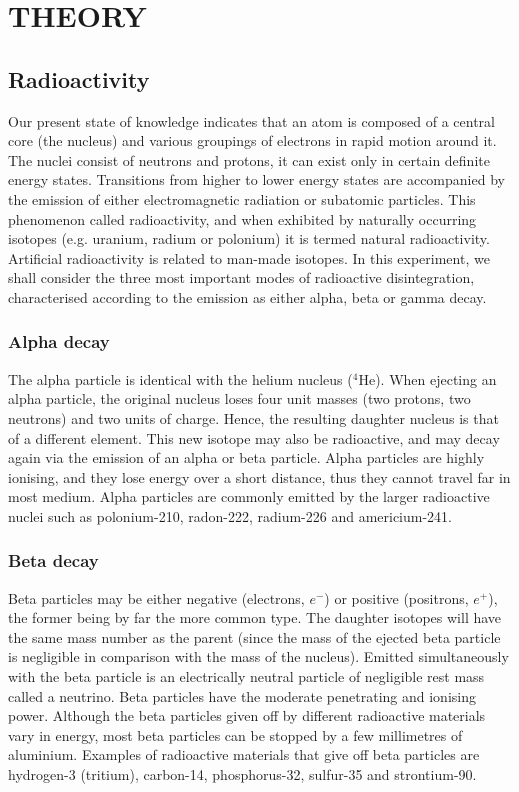 \documentclass[a4paper,11pt]{article}
\begin{document}
\newpage
{}
\section*{\center THEORY}
\label{sec:THEORY}
\subsection*{Radioactivity}
Our present state of knowledge indicates that an atom is composed of a central core (the nucleus) and various groupings of electrons in rapid motion around it. The nuclei consist of neutrons and protons, it can exist only in certain definite energy states. Transitions from higher to lower energy states are accompanied by the emission of either electromagnetic radiation or subatomic particles. This phenomenon called radioactivity, and when exhibited by naturally occurring isotopes (e.g. uranium, radium or polonium) it is termed natural radioactivity.\\

Artificial radioactivity is related to man-made isotopes. In this experiment, we shall consider the three most important modes of radioactive disintegration, characterised according to the emission as either alpha, beta or gamma decay.

\subsubsection*{Alpha decay}
The alpha particle is identical with the helium nucleus ($^4\mathrm{He}$). When ejecting an alpha particle, the original nucleus loses four unit masses (two protons, two neutrons) and two units of charge. Hence, the resulting daughter nucleus is that of a different element. This new isotope may also be radioactive, and may decay again via the emission of an alpha or beta particle. Alpha particles are highly ionising, and they lose energy over a short distance, thus they cannot travel far in most medium. Alpha particles are commonly emitted by the larger radioactive nuclei such as polonium-210, radon-222, radium-226 and americium-241.

\subsubsection*{Beta decay}
Beta particles may be either negative (electrons, $e^-$) or positive (positrons, $e^+$), the former being by far the more common type. The daughter isotopes will have the same mass number as the parent (since the mass of the ejected beta particle is negligible in comparison with the mass of the nucleus). Emitted simultaneously with the beta particle is an electrically neutral particle of negligible rest mass called a neutrino. Beta particles have the moderate penetrating and ionising power. Although the beta particles given off by different radioactive materials vary in energy, most beta particles can be stopped by a few millimetres of aluminium. Examples of radioactive materials that give off beta particles are hydrogen-3 (tritium), carbon-14, phosphorus-32, sulfur-35 and strontium-90.
\end{document}
